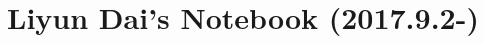 \documentclass[10pt]{article}
\title{\vspace{-4ex}\Large{Liyun Dai's Notebook (2017.9.2-)}}
\author{}
\date{}
\begin{document}
\begin{landscape}
\begin{multicols}{2}

\maketitle
\vspace{-13ex}
\tableofcontents
\pagestyle{fancy}



\end{multicols}
\end{landscape}
\end{document}
